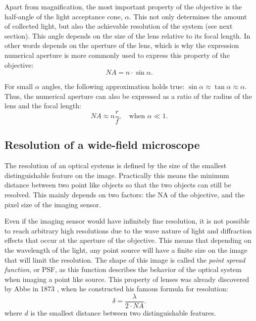     Apart from magnification, the most important property of the objective is the half-angle of the light acceptance cone, $\alpha$. This not only determines the amount of collected light, but also the achievable resolution of the system (see next section). This angle depends on the size of the lens relative to its focal length. In other words depends on the aperture of the lens, which is why the expression numerical aperture is more commonly used to express this property of the objective:
    \begin{equation}
      NA = n\cdot \sin \alpha.
      \label{eq:NA}
    \end{equation}

    For small $\alpha$ angles, the following approximation holds true: $\sin \alpha \approx \tan \alpha \approx \alpha$. Thus, the numerical aperture can also be expressed as a ratio of the radius of the lens and the focal length:
    \begin{equation}
      NA \approx n \frac{r}{f},\quad \text{when }\alpha \ll 1.
    \end{equation}



  \subsection{Resolution of a wide-field microscope}
    The resolution of an optical systems is defined by the size of the smallest distinguishable feature on the image. Practically this means the minimum distance between two point like objects so that the two objects can still be resolved. This mainly depends on two factors: the NA of the objective, and the pixel size of the imaging sensor.

    Even if the imaging sensor would have infinitely fine resolution, it is not possible to reach arbitrary high resolutions due to the wave nature of light and diffraction effects that occur at the aperture of the objective. This means that depending on the wavelength of the light, any point source will have a finite size on the image that will limit the resolution. The shape of this image is called the \textit{point spread function}, or PSF, as this function describes the behavior of the optical system when imaging a point like source. This property of lenses was already discovered by Abbe in 1873 \cite{abbe_beitrage_1873}, when he constructed his famous formula for resolution:
    \begin{equation}
      \delta = \frac{\lambda}{2 \cdot NA}.
      \label{eq:abbe}
    \end{equation}
    where $d$ is the smallest distance between two distinguishable features.

